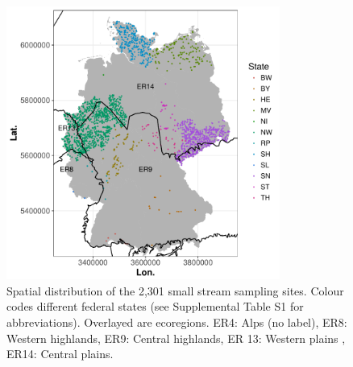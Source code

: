 \documentclass[pdftex,
	a4paper,
	titlepage=false]{scrreprt}
\begin{document}
\begin{figure}[ht]
	\centering
	\includegraphics[width = 0.8\textwidth]{fig_map}
	\caption{Spatial distribution of the 2,301 small stream sampling sites. Colour codes different federal states (see Supplemental Table S1 for abbreviations). Overlayed are ecoregions. ER4: Alps (no label), ER8: Western highlands,
	ER9: Central highlands, ER 13: Western plains , ER14: Central plains. }
	\label{fig:ecoreg}
\end{figure}




\newpage

\end{document}
